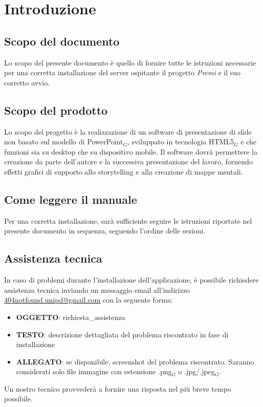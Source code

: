 \section{Introduzione}
\subsection{Scopo del documento}
Lo scopo del presente documento è quello di fornire tutte le istruzioni necessarie per una corretta installazione del server ospitante il progetto \emph{Premi} e il suo corretto avvio.

\subsection{Scopo del prodotto}
Lo scopo del progetto è la realizzazione di un software di presentazione di slide non basato sul modello di PowerPoint$_{G}$, sviluppato in tecnologia HTML5$_{G}$ e che funzioni sia su desktop che su dispositivo mobile. Il software dovrà permettere la creazione da parte dell'autore e la successiva presentazione del lavoro, fornendo effetti grafici di supporto allo storytelling e alla creazione di mappe mentali.

\subsection{Come leggere il manuale}
Per una corretta installazione, sarà sufficiente seguire le istruzioni riportate nel presente documento in sequenza, seguendo l'ordine delle sezioni.

\subsection{Assistenza tecnica}
In caso di problemi durante l'installazione dell'applicazione, è possibile richiedere assistenza tecnica inviando un messaggio email all'indirizzo \href{mailto:404notfound.unipd@gmail.com}{404notfound.unipd@gmail.com} con la seguente forma:
\begin{itemize}
\item \textbf{OGGETTO}: richiesta\_assistenza
\item \textbf{TESTO}: descrizione dettagliata del problema riscontrato in fase di installazione
\item \textbf{ALLEGATO}: se disponibile, screenshot del problema riscontrato. Saranno considerati solo file immagine con estensione .png$_G$ o .jpg/.jpeg$_G$.
\end{itemize}
Un nostro tecnico provvederà a fornire una risposta nel più breve tempo possibile.

